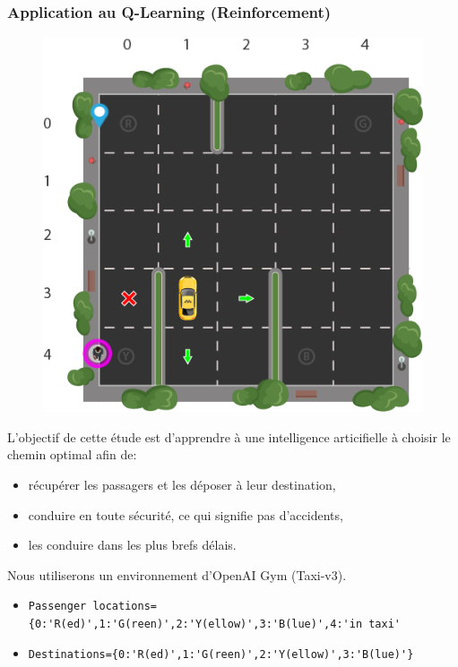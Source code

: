\begin{frame}[fragile]
\frametitle{Application au Q-Learning (Reinforcement)}

\begin{figure}
\vspace{-0.5cm}
  \begin{center}
    \includegraphics[width=0.9\linewidth]{img/qlearning}
  \end{center}
\end{figure}

L'objectif de cette étude est d'apprendre à une intelligence articifielle à  choisir le chemin optimal afin de:
\begin{itemize}
 \item récupérer les passagers et les déposer à leur destination,
 \item conduire en toute sécurité, ce qui signifie pas d'accidents,
 \item les conduire dans les plus brefs délais.
\end{itemize}

Nous utiliserons un environnement d'OpenAI Gym (Taxi-v3).

\begin{itemize}
 \item \verb?Passenger locations={0:'R(ed)',1:'G(reen)',2:'Y(ellow)',3:'B(lue)',4:'in taxi'?
 \item \verb?Destinations={0:'R(ed)',1:'G(reen)',2:'Y(ellow)',3:'B(lue)'}?
\end{itemize}

\end{frame}

